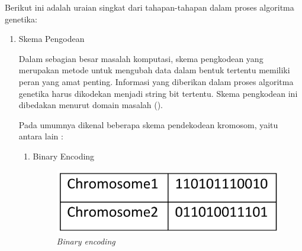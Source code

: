 Berikut ini adalah uraian singkat dari tahapan-tahapan dalam proses algoritma genetika:
\begin{enumerate}
  \item Skema Pengodean
  
  Dalam sebagian besar masalah komputasi, skema pengkodean yang merupakan metode untuk 
  mengubah data dalam bentuk tertentu memiliki peran yang amat penting. 
  Informasi yang diberikan dalam proses algoritma genetika harus dikodekan menjadi string bit tertentu. 
  Skema pengkodean ini dibedakan menurut domain masalah (\cite{Katoch2020}).
  
  Pada umumnya dikenal beberapa skema pendekodean kromosom, yaitu antara lain : 
  \begin{enumerate}
    \item Binary Encoding
      \begin{figure} [ht] \centering
        \includegraphics[scale=0.25]{gambar/binary.png}
        \caption{\emph{Binary encoding}}
        \label{fig:binary}
      \end{figure}


\end{enumerate}
\end{enumerate}

